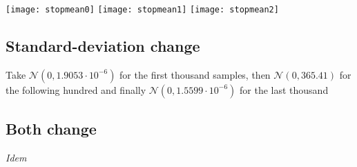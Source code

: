 \documentclass[11pt]{article}
\begin{document}
\texttt{[image: stopmean0]}
\hspace*{-5.3cm}\texttt{[image: stopmean1]}
\texttt{[image: stopmean2]}

\subsection{Standard-deviation change}
	
Take $\mathcal N(0,1.9053\cdot10^{-6})$ for the first thousand samples, then $\mathcal N(0,365.41)$ for the following hundred and finally $\mathcal N(0,1.5599\cdot10^{-6})$ for the last thousand

\subsection{Both change}

\emph{Idem}
\end{document}
